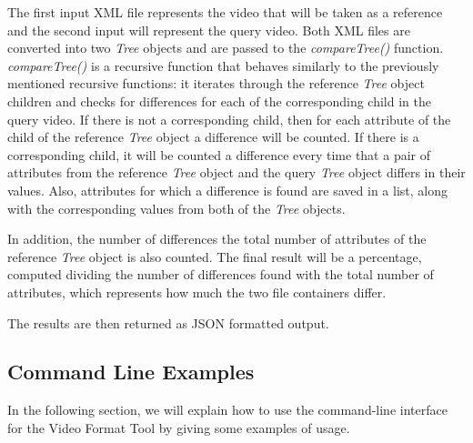 The first input XML file represents the video that will be taken as a reference and the second input will represent the query video. Both XML files are converted into two \emph{Tree} objects and are passed to the \emph{compareTree()} function. \emph{compareTree()} is a recursive function that behaves similarly to the previously mentioned recursive functions: it iterates through the reference \emph{Tree} object children and checks for differences for each of the corresponding child in the query video. If there is not a corresponding child, then for each attribute of the child of the reference \emph{Tree} object a difference will be counted. If there is a corresponding child, it will be counted a difference every time that a pair of attributes from the reference \emph{Tree} object and the query \emph{Tree} object differs in their values. Also, attributes for which a difference is found are saved in a list, along with the corresponding values from both of the \emph{Tree} objects.

In addition, the number of differences the total number of attributes of the reference \emph{Tree} object is also counted. The final result will be a percentage, computed dividing the number of differences found with the total number of attributes, which represents how much the two file containers differ.

The results are then returned as JSON formatted output.

\subsection{Command Line Examples}

In the following section, we will explain how to use the command-line interface for the Video Format Tool by giving some examples of usage.


